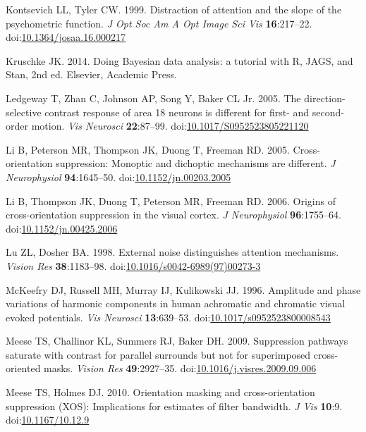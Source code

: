 \documentclass[]{article}
\begin{document}
\leavevmode\hypertarget{ref-Kontsevich1999}{}%
Kontsevich LL, Tyler CW. 1999. Distraction of attention and the slope of the psychometric function. \emph{J Opt Soc Am A Opt Image Sci Vis} \textbf{16}:217--22. doi:\href{https://doi.org/10.1364/josaa.16.000217}{10.1364/josaa.16.000217}

\leavevmode\hypertarget{ref-Kruschke2014}{}%
Kruschke JK. 2014. Doing Bayesian data analysis: a tutorial with R, JAGS, and Stan, 2nd ed. Elsevier, Academic Press.

\leavevmode\hypertarget{ref-Ledgeway2005}{}%
Ledgeway T, Zhan C, Johnson AP, Song Y, Baker CL Jr. 2005. The direction-selective contrast response of area 18 neurons is different for first- and second-order motion. \emph{Vis Neurosci} \textbf{22}:87--99. doi:\href{https://doi.org/10.1017/S0952523805221120}{10.1017/S0952523805221120}

\leavevmode\hypertarget{ref-Li2005}{}%
Li B, Peterson MR, Thompson JK, Duong T, Freeman RD. 2005. Cross-orientation suppression: Monoptic and dichoptic mechanisms are different. \emph{J Neurophysiol} \textbf{94}:1645--50. doi:\href{https://doi.org/10.1152/jn.00203.2005}{10.1152/jn.00203.2005}

\leavevmode\hypertarget{ref-Li2006}{}%
Li B, Thompson JK, Duong T, Peterson MR, Freeman RD. 2006. Origins of cross-orientation suppression in the visual cortex. \emph{J Neurophysiol} \textbf{96}:1755--64. doi:\href{https://doi.org/10.1152/jn.00425.2006}{10.1152/jn.00425.2006}

\leavevmode\hypertarget{ref-Lu1998}{}%
Lu ZL, Dosher BA. 1998. External noise distinguishes attention mechanisms. \emph{Vision Res} \textbf{38}:1183--98. doi:\href{https://doi.org/10.1016/s0042-6989(97)00273-3}{10.1016/s0042-6989(97)00273-3}

\leavevmode\hypertarget{ref-McKeefry1996}{}%
McKeefry DJ, Russell MH, Murray IJ, Kulikowski JJ. 1996. Amplitude and phase variations of harmonic components in human achromatic and chromatic visual evoked potentials. \emph{Vis Neurosci} \textbf{13}:639--53. doi:\href{https://doi.org/10.1017/s0952523800008543}{10.1017/s0952523800008543}

\leavevmode\hypertarget{ref-Meese2009}{}%
Meese TS, Challinor KL, Summers RJ, Baker DH. 2009. Suppression pathways saturate with contrast for parallel surrounds but not for superimposed cross-oriented masks. \emph{Vision Res} \textbf{49}:2927--35. doi:\href{https://doi.org/10.1016/j.visres.2009.09.006}{10.1016/j.visres.2009.09.006}

\leavevmode\hypertarget{ref-Meese2010}{}%
Meese TS, Holmes DJ. 2010. Orientation masking and cross-orientation suppression (XOS): Implications for estimates of filter bandwidth. \emph{J Vis} \textbf{10}:9. doi:\href{https://doi.org/10.1167/10.12.9}{10.1167/10.12.9}
\end{document}
